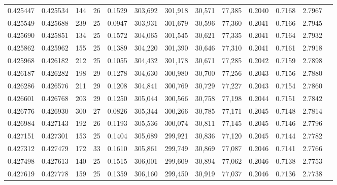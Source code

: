 \begin{tabular}{rrrrrrrrrrrrr}
0.425447 & 0.425534 &    144 &    26 &                                     0.1529 & 303,692 & 301,918 &  30,571 &  77,385 & 0.2040 & 0.7168 & 2.7967 \\
0.425549 & 0.425688 &    239 &    25 &                                     0.0947 & 303,931 & 301,679 &  30,596 &  77,360 & 0.2041 & 0.7166 & 2.7945 \\
0.425690 & 0.425851 &    134 &    25 &                                     0.1572 & 304,065 & 301,545 &  30,621 &  77,335 & 0.2041 & 0.7164 & 2.7932 \\
0.425862 & 0.425962 &    155 &    25 &                                     0.1389 & 304,220 & 301,390 &  30,646 &  77,310 & 0.2041 & 0.7161 & 2.7918 \\
0.425968 & 0.426182 &    212 &    25 &                                     0.1055 & 304,432 & 301,178 &  30,671 &  77,285 & 0.2042 & 0.7159 & 2.7898 \\
0.426187 & 0.426282 &    198 &    29 &                                     0.1278 & 304,630 & 300,980 &  30,700 &  77,256 & 0.2043 & 0.7156 & 2.7880 \\
0.426286 & 0.426576 &    211 &    29 &                                     0.1208 & 304,841 & 300,769 &  30,729 &  77,227 & 0.2043 & 0.7154 & 2.7860 \\
0.426601 & 0.426768 &    203 &    29 &                                     0.1250 & 305,044 & 300,566 &  30,758 &  77,198 & 0.2044 & 0.7151 & 2.7842 \\
0.426776 & 0.426930 &    300 &    27 &                                     0.0826 & 305,344 & 300,266 &  30,785 &  77,171 & 0.2045 & 0.7148 & 2.7814 \\
0.426984 & 0.427143 &    192 &    26 &                                     0.1193 & 305,536 & 300,074 &  30,811 &  77,145 & 0.2045 & 0.7146 & 2.7796 \\
0.427151 & 0.427301 &    153 &    25 &                                     0.1404 & 305,689 & 299,921 &  30,836 &  77,120 & 0.2045 & 0.7144 & 2.7782 \\
0.427312 & 0.427479 &    172 &    33 &                                     0.1610 & 305,861 & 299,749 &  30,869 &  77,087 & 0.2046 & 0.7141 & 2.7766 \\
0.427498 & 0.427613 &    140 &    25 &                                     0.1515 & 306,001 & 299,609 &  30,894 &  77,062 & 0.2046 & 0.7138 & 2.7753 \\
0.427619 & 0.427778 &    159 &    25 &                                     0.1359 & 306,160 & 299,450 &  30,919 &  77,037 & 0.2046 & 0.7136 & 2.7738 \\

\end{tabular}
